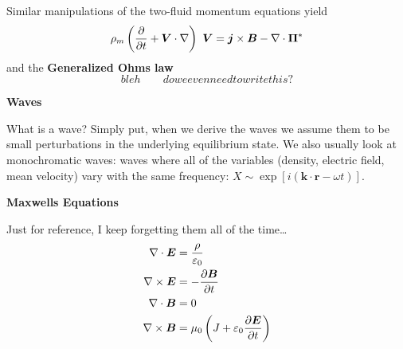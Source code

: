 \documentclass[10pt,landscape]{article}
\renewcommand{\vec}{\bm}
\newcommand{\topiccolor}{green}
\renewcommand{\section}[2]{%
	\renewcommand{\topiccolor}{#2}
	\begin{tcolorbox}[boxsep=0.5mm, left=1mm, right=1mm, top=0mm, bottom=0mm,
		colback=#2!30, colframe=#2, arc is angular]%
		\centering \textbf{#1}%
	\end{tcolorbox}%
	\nopagebreak%
}
\newcommand{\cbf}[1]{\textcolor{\topiccolor!80!black}{\textbf{#1}}}
\begin{document}
\begin{multicols*}{3}
Similar manipulations of the two-fluid momentum equations yield
\[
	\rho_m\left(\diffp{}{t} + \vec V \cdot \nabla\right) \vec V
	= \vec j \times \vec B - \nabla \cdot \vec \Pi^*
\]
and the \cbf{Generalized Ohms law}
\[
	bleh\qquad do we even need to write this?
\]

\section{Waves}{red}

What is a wave?
Simply put, when we derive the waves we assume them to be small
perturbations in the underlying equilibrium state.
We also usually look at monochromatic waves:
waves where all of the variables
(density, electric field, mean velocity)
vary with the same frequency:
$X \sim \exp[i (\vec k \cdot \vec r - \omega t)]$.

\section{Maxwells Equations}{gray}

Just for reference, I keep forgetting them all of the time\ldots
\begin{align*}
	\nabla \cdot \vec E &= \frac{\rho}{\varepsilon_0}\\
	\nabla \times \vec E &= -\diffp{\vec B}{t}\\
	\nabla \cdot \vec B &= 0\\
	\nabla \times \vec B &= \mu_0\left(J + \varepsilon_0 \diffp{\vec E}{t}\right)
\end{align*}

\end{multicols*}
\end{document}
